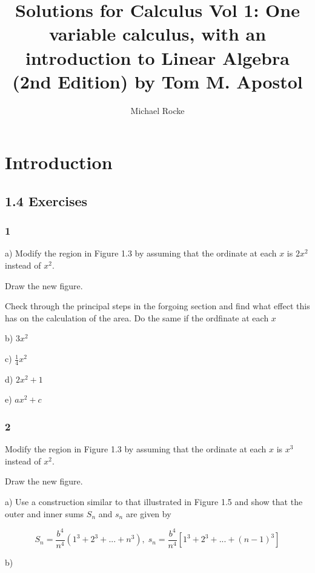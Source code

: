 \documentclass{report}
\title{Solutions for Calculus Vol 1: One variable calculus, with an introduction to Linear Algebra (2nd Edition) by Tom M. Apostol}
\author{Michael Rocke}
\begin{document}
\maketitle

\tableofcontents

\section{Introduction}

\subsection{1.4 Exercises}

\subsubsection{1}


a) Modify the region in Figure 1.3 by assuming that the ordinate at each $x$ is $2x^2$ instead of $x^2$. 

Draw the new figure. 

Check through the principal steps in the forgoing section and find what effect this has on the calculation of the area. Do the same if the ordfinate at each $x$

b) $3x^2$

c) $\frac{1}{4}x^2$

d) $2x^2 + 1$

e) $ax^2 + c$

\subsubsection{2}

Modify the region in Figure 1.3 by assuming that the ordinate at each $x$ is $x^3$ instead of $x^2$.

Draw the new figure.

a) Use a construction similar to that illustrated in Figure 1.5 and show that the outer and inner sums $S_n$ and $s_n$ are given by

\[
S_n = \frac{b^4}{n^4} (1^3 + 2^3 + ... + n^3), \; s_n = \frac{b^4}{n^4}[1^3 + 2^3 + ... + (n - 1)^3]
\]


b)
\end{document}
